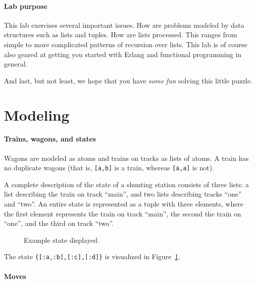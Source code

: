 \documentclass[a4paper,11pt]{article}
\begin{document}
\paragraph{Lab purpose}

This lab exercises several important issues.  How are problems modeled
by data structures such as lists and tuples.  How are lists
processed. This ranges from simple to more complicated patterns of
recursion over lists. This lab is of course also geared at getting you
started with Erlang and functional programming in general.

And last, but not least, we hope that you have \emph{some fun} solving
this little puzzle.

\section{Modeling}

\paragraph{Trains, wagons, and states}

Wagons are modeled as atoms and trains on tracks as lists of atoms. A
train has no duplicate wagons (that is, \verb+[a,b]+ is a train,
whereas \verb+[a,a]+ is not).

A complete description of the state of a shunting station
consists of three lists: a list describing the train on track
``main'', and two lists describing tracks ``one'' and ``two''. An
entire state is represented as a tuple with three elements, where
the first element represents the train on track ``main'', the
second the train on ``one'', and the third on track ``two''.

\newcommand{\wagon}[3]{
\rput(#1,#2){
\psframebox[fillstyle=solid,fillcolor=lightgray,linecolor=white]{\small
    $\strut$ #3}}}
 
\begin{figure}[h]
\begin{center}
\end{center}
\caption{Example state displayed.}
\label{fig:ex-state}
\end{figure}


The state \verb+{[:a,:b],[:c],[:d]}+
is visualized in Figure~\ref{fig:ex-state}.

\paragraph{Moves}
\end{document}

